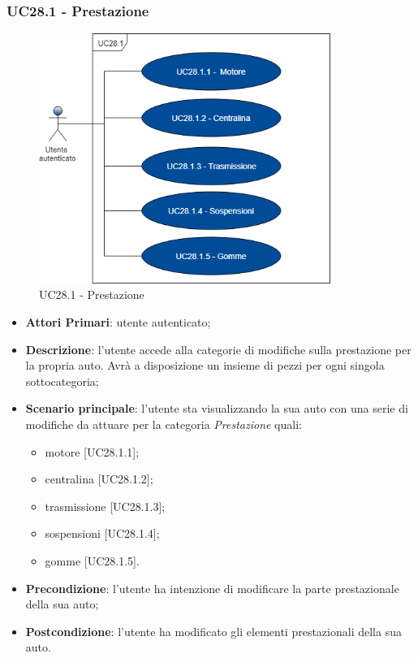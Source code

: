 \subsubsection{UC28.1 - Prestazione}
\begin{figure}[h]
	\includegraphics[width=9.5cm]{res/images/UC26-1Prestazioni.png}
	\centering
	\caption{UC28.1 - Prestazione}
\end{figure}
\begin{itemize}
	\item \textbf{Attori Primari}: utente autenticato;
	\item \textbf{Descrizione}: l'utente accede alla categorie di modifiche sulla prestazione per la propria auto. Avrà a disposizione un insieme di pezzi per ogni singola sottocategoria;
	\item \textbf{Scenario principale}: l'utente sta visualizzando la sua auto con una serie di modifiche da attuare per la categoria \textit{Prestazione} quali:
	\begin{itemize}
		\item motore [UC28.1.1];
		\item centralina [UC28.1.2];
		\item trasmissione [UC28.1.3];
		\item sospensioni [UC28.1.4];
		\item gomme [UC28.1.5].
	\end{itemize}
	\item \textbf{Precondizione}: l'utente ha intenzione di modificare la parte prestazionale della sua auto;
	\item \textbf{Postcondizione}: l'utente ha modificato gli elementi prestazionali della sua auto.
\end{itemize}
